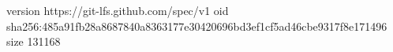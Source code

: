 version https://git-lfs.github.com/spec/v1
oid sha256:485a91fb28a8687840a8363177e30420696bd3ef1cf5ad46cbe9317f8e171496
size 131168
